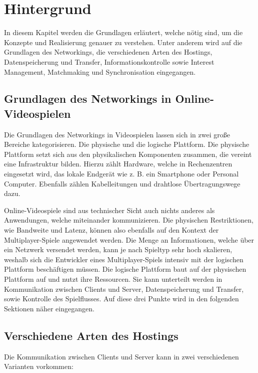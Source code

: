 
\chapter{Hintergrund}
\label{sec:hintergrund}

In diesem Kapitel werden die Grundlagen erläutert, welche nötig sind, um die Konzepte und Realisierung genauer zu verstehen. Unter anderem wird auf die Grundlagen des Networkings, die verschiedenen Arten des Hostings, Datenspeicherung und Transfer, Informationskontrolle sowie Interest Management, Matchmaking und Synchronisation eingegangen.

\section{Grundlagen des Networkings in Online-Videospielen}

Die Grundlagen des Networkings in Videospielen lassen sich in zwei große Bereiche kategorisieren. Die physische und die logische Plattform. Die physische Plattform setzt sich aus den physikalischen Komponenten zusammen, die vereint eine Infrastruktur bilden. Hierzu zählt Hardware, welche in Rechenzentren eingesetzt wird, das lokale Endgerät wie z. B. ein Smartphone oder Personal Computer. Ebenfalls zählen Kabelleitungen und drahtlose Übertragungswege dazu. 

Online-Videospiele sind aus technischer Sicht auch nichts anderes als Anwendungen, welche miteinander kommunizieren. Die physischen Restriktionen, wie Bandweite und Latenz, können also ebenfalls auf den Kontext der Multiplayer-Spiele angewendet werden. Die Menge an Informationen, welche über ein Netzwerk versendet werden, kann je nach Spieltyp sehr hoch skalieren, weshalb sich die Entwickler eines Multiplayer-Spiels intensiv mit der logischen Plattform beschäftigen müssen. Die logische Plattform baut auf der physischen Plattform auf und nutzt ihre Ressourcen. Sie kann unterteilt werden in Kommunikation zwischen Clients und Server, Datenspeicherung und Transfer, sowie Kontrolle des Spielflusses. Auf diese drei Punkte wird in den folgenden Sektionen näher eingegangen. \cite{Smed.2002c}

\section{Verschiedene Arten des Hostings}
\label{arten_des_hostings}

Die Kommunikation zwischen Clients und Server kann in zwei verschiedenen Varianten vorkommen:

